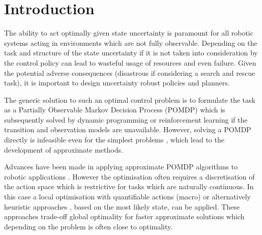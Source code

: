 \documentclass[final,5p,times,twocolumn]{elsarticle}
\begin{document}
\section{Introduction}

The ability to act optimally given state uncertainty is paramount for all robotic systems acting in 
environments which are not fully observable. Depending on the task and structure of the state
uncertainty if it is not taken into consideration by the control policy can lead to wasteful usage of resources 
and even failure. Given the potential adverse consequences (disastrous if considering a search and rescue task), 
it is important to design uncertainty robust policies and planners.

The generic solution to such an optimal control problem is to formulate the task as a
Partially Observable Markov Decision Process (POMDP) which is subsequently solved by dynamic programming
or reinforcement learning if the transition and observation models are unavailable. 
However, solving a POMDP directly is infeasible even for the simplest problems \cite{PBVI}, which 
lead to the development of approximate methods. 

Advances have been made in applying approximate POMDP algorithms to robotic applications
\cite{pomdp_peg_icra_2014}. However the optimisation often requires a discretisation of the 
action space which is restrictive for tasks which are naturally continuous. In this case
a local optimisation with quantifiable actions (macro) \cite{toussain_2015} or alternatively heuristic 
approaches \cite{Lauri2016}, based on the most likely state, can be applied. 
These approaches trade-off global optimality for faster approximate solutions which depending on 
the problem is often close to optimality. 

%
%
%
%
%
%
\end{document}
